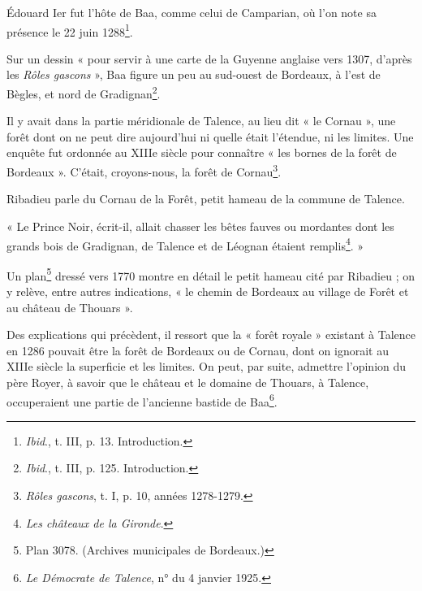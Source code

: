 Édouard Ier fut l'hôte de Baa, comme celui de Camparian, où l'on note sa présence le 22 juin 1288\footnote{\textit{Ibid}., t. III, p. 13. Introduction.}.

Sur un dessin « pour servir à une carte de la Guyenne anglaise vers 1307, d'après les \textit{Rôles gascons} », Baa figure un peu au sud-ouest de Bordeaux, à l'est de Bègles, et nord de Gradignan\footnote{\textit{Ibid}., t. III, p. 125. Introduction.}. 

Il y avait dans la partie méridionale de Talence, au lieu dit « le Cornau », une forêt dont on ne peut dire aujourd'hui ni quelle était l'étendue, ni les limites. Une enquête fut ordonnée au XIIIe siècle pour connaître « les bornes de la forêt de Bordeaux ». C'était, croyons-nous, la forêt de Cornau\footnote{\textit{Rôles gascons}, t. I, p. 10, années 1278-1279.}.

Ribadieu parle du Cornau de la Forêt, petit hameau de la commune de Talence.

« Le Prince Noir, écrit-il, allait chasser les bêtes fauves ou mordantes dont les grands bois de Gradignan, de Talence et de Léognan étaient remplis\footnote{\textit{Les châteaux de la Gironde}.}. »

Un plan\footnote{Plan 3078. (Archives municipales de Bordeaux.)} dressé vers 1770 montre en détail le petit hameau cité par Ribadieu ; on y relève, entre autres indications, « le chemin de Bordeaux au village de Forêt et au château de Thouars ».

Des explications qui précèdent, il ressort que la « forêt royale » existant à Talence en 1286 pouvait être la forêt de Bordeaux ou de Cornau, dont on ignorait au XIIIe siècle la superficie et les limites. On peut, par suite, admettre l'opinion du père Royer, à savoir que le château et le domaine de Thouars, à Talence, occuperaient une partie de l'ancienne bastide de Baa\footnote{\textit{Le Démocrate de Talence}, n° du 4 janvier 1925.}.